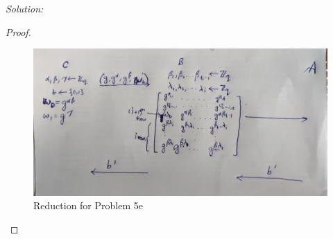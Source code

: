 \documentclass[a4paper, 11pt]{article}
\newenvironment{solution}
    {\textit{Solution:}}
    {\clearpage}
\begin{document}
\begin{solution}
\begin{enumerate}[(a)]
\begin{proof}
                  \begin{figure}[!ht]
                      \centering
                      \includegraphics[scale=0.25]{images/Reduction5e.jpg}
                      \caption{Reduction for Problem 5e}
                      \label{fig:p5e}
                  \end{figure}


\end{proof}
\end{enumerate}
\end{solution}
\end{document}
